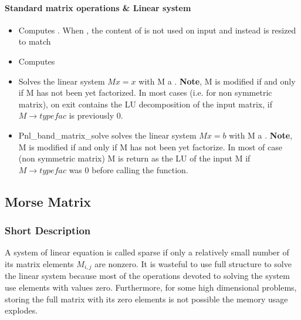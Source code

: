 \paragraph{Standard matrix operations \& Linear system}
\begin{itemize}
\item {} 
  \sshortdescribe Computes . When , the
  content of  is not used on input and instead  is resized to
  match 
\item {}
  \sshortdescribe Computes 
\item 
  \sshortdescribe Solves the linear system $M x = x$ with M a .
  {\bf Note}, M is modified if and only if M has not been yet factorized.
  In most cases (i.e. for non symmetric matrix), on exit  contains the
  LU decomposition of the input matrix, 
  if $M\rightarrow typefac$ is previously $0$.   
\item  {} 
  \sshortdescribe Pnl_band_matrix_solve solves the
  linear system $ M x = b $ with M a .
  {\bf Note}, M is modified if and only if M has not been yet factorize.
  In most of case (non symmetric matrix) M is return as the LU of the input M
  if $M\rightarrow typefac$ was $0$ before calling the function. 
\end{itemize}

\subsection{Morse Matrix}
\subsubsection{Short Description}

A system of linear equation is called sparse if only a relatively small number
of its matrix elements $M_{i, j}$ are nonzero. It is wasteful to use full
structure to solve the linear system because most of the operations devoted to
solving the system use elements with values zero. Furthermore, for some 
high dimensional problems, storing the full matrix with its zero elements is not
possible the memory usage explodes.


